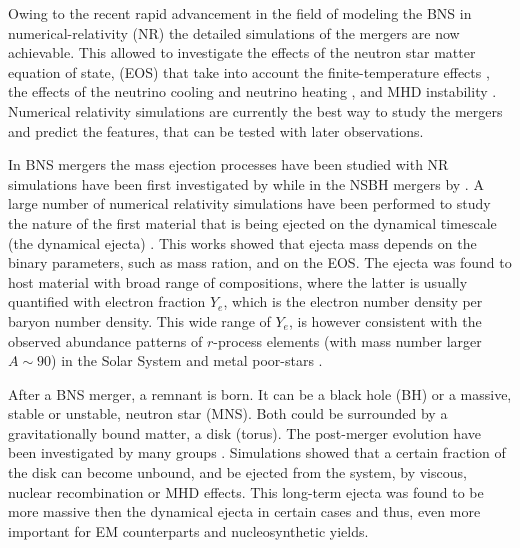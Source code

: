 \documentclass[11pt,a4paper,headinclude=true,DIV=14,BCOR=8mm,chapterprefix,listof=totoc,twoside,openright,abstracton]{scrbook}
\newcommand{\rproc}{$r$-process}
\newcommand{\pmerg}{post-merger}
\begin{document}
Owing to the recent rapid advancement in the field of modeling the BNS in numerical-relativity (NR) 
the detailed simulations of the mergers are now achievable.
This allowed to investigate the effects of the neutron star matter equation of state, (EOS) that 
take into account the finite-temperature effects \citep{Duez:2009yz,Sekiguchi:2011zd},
the effects of the neutrino cooling \citep{Sekiguchi:2011zd,Deaton:2013sla,Foucart:2014nda,Palenzuela:2015dqa} and neutrino heating \citep{Sekiguchi:2015dma,Foucart:2016rxm}, and
MHD instability \citep{Kiuchi:2014hja,Kiuchi:2015sga,Kiuchi:2015sga}.
Numerical relativity simulations are currently the best way to study the mergers and predict the features, 
that can be tested with later observations.

In BNS mergers the mass ejection processes have been studied with NR simulations have been first 
investigated by \citet{Hotokezaka:2013b} while in the NSBH mergers by \citet{Foucart:2012vn}. A large number of numerical relativity 
simulations have been performed to study the nature of the first material that is being ejected 
on the dynamical timescale (the dynamical ejecta) \cite{(Sekiguchi:2015dma,Palenzuela:2015dqa,Lovelace:2013vma,Kyutoku:2013wxa,Foucart:2015vpa,Foucart:2015gaa,Foucart:2016rxm,Sekiguchi:2016bjd,Lehner:2016lxy,Radice:2016dwd,Foucart:2016vxd,Kyutoku:2017voj,Dietrich:2018uni,Dietrich:2016lyp,Bovard:2017mvn,Radice:2018pdn}. This works showed that ejecta mass depends on the binary parameters, such as mass ration, and on 
the EOS. The ejecta was found to host material with broad range of compositions, where the latter 
is usually quantified with electron fraction $Y_e$, which is the electron number density per baryon 
number density. This wide range of $Y_e$, is however consistent with the observed abundance patterns 
of \rproc{} elements (with mass number larger $A\sim90$) in the Solar System and metal poor-stars \citep{Wanajo:2014,Radice:2016dwd}.

After a BNS merger, a remnant is born. It can be a black hole (BH) or a massive, stable or unstable, neutron star (MNS). Both could be surrounded by a gravitationally bound matter, a disk (torus). 
The \pmerg{} evolution have been investigated by many groups \citep{Fernandez:2013tya,Metzger:2014ila,Perego:2014fma,Fernandez:2014cna,Just:2014,Fernandez:2016sbf,Siegel:2017nub,Fujibayashi:2017xsz,Fernandez:2018kax}. 
Simulations showed that a certain fraction of the disk can become unbound, and be ejected from the system, 
by viscous, nuclear recombination or MHD effects. 
This long-term ejecta was found to be more massive then the dynamical ejecta in certain cases and thus,
even more important for EM counterparts and nucleosynthetic yields.
\end{document}
